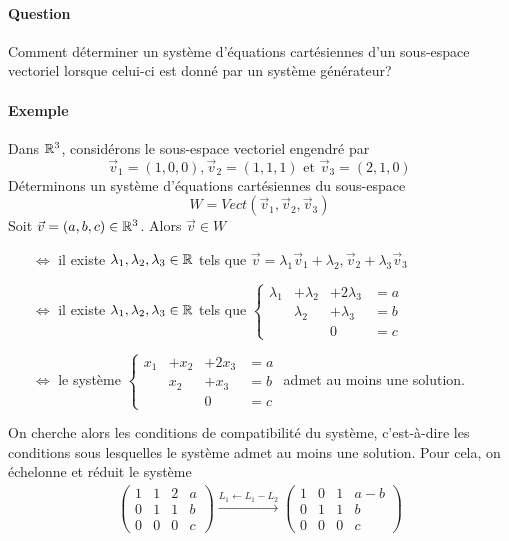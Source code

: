 \paragraph{Question} Comment déterminer un système d'équations cartésiennes d'un sous-espace vectoriel lorsque celui-ci est donné par un système générateur?

\paragraph{Exemple} Dans $\mathbb{R}^3$, considérons le sous-espace vectoriel engendré par 
$$\vec{v}_1 = (1, 0, 0), \vec{v}_2 = (1, 1, 1) \text{ et }\vec{v}_3 = (2, 1, 0)$$
Déterminons un système d'équations cartésiennes du sous-espace 
$$W = Vect(\vec{v}_1, \vec{v}_2, \vec{v}_3)$$
Soit $\vec{v} = (a, b, c) \in \mathbb{R}^3$. Alors $\vec{v} \in W$ 
\begin{itemize}
  \item[$\Leftrightarrow$] il existe $\lambda_1, \lambda_2, \lambda_3 \in \mathbb{R}$ tels que $\vec{v} = \lambda_1 \vec{v}_1 + \lambda_2, \vec{v}_2 + \lambda_3 \vec{v}_3$ 
  \item[$\Leftrightarrow$] il existe $\lambda_1, \lambda_2, \lambda_3 \in \mathbb{R}$ tels que 
    $\left\{ \begin{array}{rrrc}
       \lambda_1 & + \lambda_2 & + 2 \lambda_3 & = a \\
       & \lambda_2 & + \lambda_3 & = b \\
       &  & 0 & = c
    \end{array} \right. $
  \item [$\Leftrightarrow$] le système 
    $\left\{ \begin{array}{rrrc}
      x_1 & + x_2 & + 2 x_3 & = a \\
       & x_2 & + x_3 & = b \\
       &  & 0 & = c
    \end{array} \right. $ admet au moins une solution.
\end{itemize}
On cherche alors les conditions de compatibilité du système, c'est-à-dire les conditions sous lesquelles le système admet au moins une solution. Pour cela, on échelonne et réduit le système
\begin{eqnarray*}
  \begin{pmatrix}
    1 & 1 & 2 & a \\
    0 & 1 & 1 & b \\
    0 & 0 & 0 & c
  \end{pmatrix}
  \xrightarrow{L_1 \leftarrow L_1 - L_2} 
  \begin{pmatrix}
    1 & 0 & 1 & a-b \\
    0 & 1 & 1 & b \\
    0 & 0 & 0 & c
  \end{pmatrix}
\end{eqnarray*}
